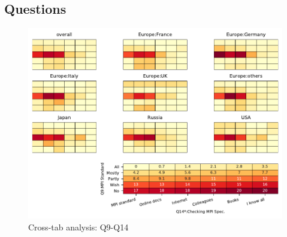 
\subsection{Questions}


\begin{figure}
\begin{center}
\includegraphics[width=12cm]{../pdfs/Q9-Q14.pdf}
\caption{Cross-tab analysis: Q9-Q14}
\label{fig:Q9-Q14}
\end{center}
\end{figure}
